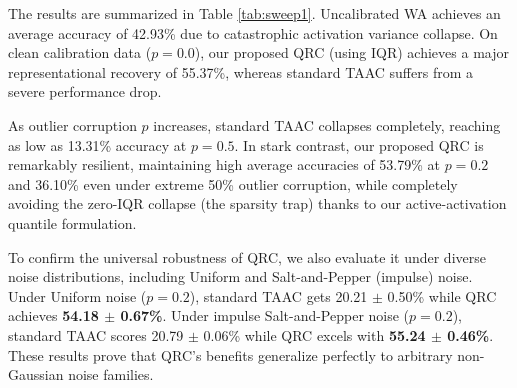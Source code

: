 \documentclass{article}
\theoremstyle{plain}
\theoremstyle{definition}
\theoremstyle{remark}
\begin{document}
The results are summarized in Table \ref{tab:sweep1}. Uncalibrated WA achieves an average accuracy of 42.93\% due to catastrophic activation variance collapse. On clean calibration data ($p=0.0$), our proposed QRC (using IQR) achieves a major representational recovery of 55.37\%, whereas standard TAAC suffers from a severe performance drop.

As outlier corruption $p$ increases, standard TAAC collapses completely, reaching as low as 13.31\% accuracy at $p=0.5$. In stark contrast, our proposed QRC is remarkably resilient, maintaining high average accuracies of 53.79\% at $p=0.2$ and 36.10\% even under extreme 50\% outlier corruption, while completely avoiding the zero-IQR collapse (the sparsity trap) thanks to our active-activation quantile formulation.

To confirm the universal robustness of QRC, we also evaluate it under diverse noise distributions, including Uniform and Salt-and-Pepper (impulse) noise. Under Uniform noise ($p=0.2$), standard TAAC gets 20.21 $\pm$ 0.50\% while QRC achieves \textbf{54.18 $\pm$ 0.67\%}. Under impulse Salt-and-Pepper noise ($p=0.2$), standard TAAC scores 20.79 $\pm$ 0.06\% while QRC excels with \textbf{55.24 $\pm$ 0.46\%}. These results prove that QRC's benefits generalize perfectly to arbitrary non-Gaussian noise families.
\end{document}
